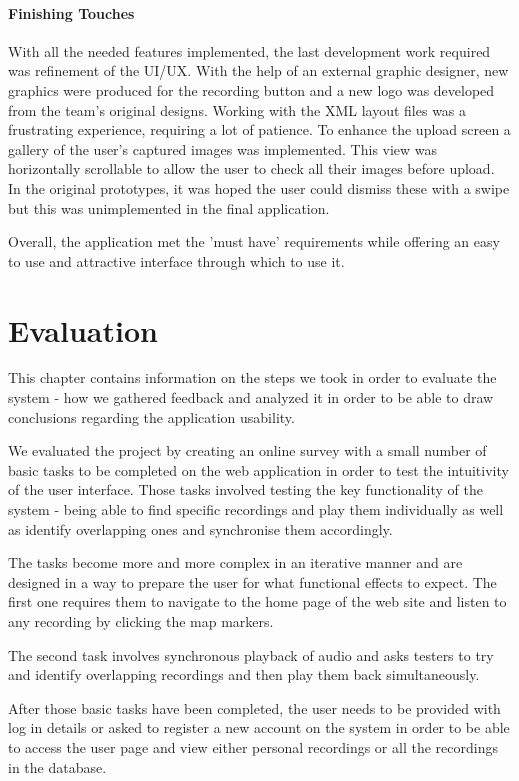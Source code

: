 \documentclass{l3proj}
\begin{document}
\subsubsection{Finishing Touches}
With all the needed features implemented, the last development work required was refinement of the UI/UX. With the help of an external graphic designer, new graphics were produced for the recording button and a new logo was developed from the team's original designs. Working with the XML layout files was a frustrating experience, requiring a lot of patience. To enhance the upload screen a gallery of the user's captured images was implemented. This view was horizontally scrollable to allow the user to check all their images before upload. In the original prototypes, it was hoped the user could dismiss these with a swipe but this was unimplemented in the final application.

Overall, the application met the 'must have' requirements while offering an easy to use and attractive interface through which to use it.

\chapter{Evaluation}

This chapter contains information on the steps we took in order to evaluate the system - how we gathered feedback and analyzed it in order to be able to draw conclusions regarding the application usability.

We evaluated the project by creating an online survey with a small number of basic tasks to be completed on the web application in order to test the intuitivity of the user interface.
Those tasks involved testing the key functionality of the system - being able to find specific recordings and play them individually as well as identify overlapping ones and synchronise them accordingly.

The tasks become more and more complex in an iterative manner and are designed in a way to prepare the user for what functional effects to expect.
The first one requires them to navigate to the home page of the web site and listen to any recording by clicking the map markers.

The second task involves synchronous playback of audio and asks testers to try and identify overlapping recordings and then play them back simultaneously.

After those basic tasks have been completed, the user needs to be provided with log in details or asked to register a new account on the system in order to be able to access the user page and view either personal recordings or all the recordings in the database.
\end{document}
